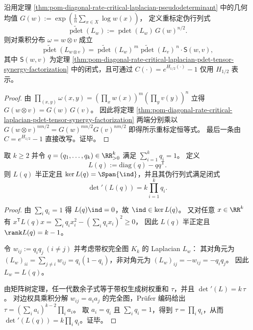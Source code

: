 \begin{corollary}\label{cor:pom-diagonal-rate-critical-laplacian-pdet-tensor-synergy-geometricmean-stripped}
沿用定理 \ref{thm:pom-diagonal-rate-critical-laplacian-pseudodeterminant} 中的几何均值
\(
G(w):=\exp(\frac1n\sum_{x\in X}\log w(x))
\)，
定义重标定伪行列式
\[
\widetilde{\operatorname{pdet}}(L_w):=\operatorname{pdet}(L_w)\,G(w)^{n/2}.
\]
则对乘积分布 \(\omega=w\otimes v\) 成立
\[
\widetilde{\operatorname{pdet}}(L_{w\otimes v})
=\widetilde{\operatorname{pdet}}(L_w)^{\,m}\widetilde{\operatorname{pdet}}(L_v)^{\,n}\cdot \mathsf S(w,v),
\]
其中 \(\mathsf S(w,v)\) 为定理 \ref{thm:pom-diagonal-rate-critical-laplacian-pdet-tensor-synergy-factorization} 中的闭式，且可通过
\(
C(\cdot)=e^{H_{1/2}(\cdot)}-1
\)
仅用 \(H_{1/2}\) 表示。
\end{corollary}
\begin{proof}
由 \(\prod_{(x,y)}\omega(x,y)=(\prod_x w(x))^m(\prod_y v(y))^n\) 立得 \(G(w\otimes v)=G(w)\,G(v)\)。
因此将定理 \ref{thm:pom-diagonal-rate-critical-laplacian-pdet-tensor-synergy-factorization} 两端分别乘以 \(G(w\otimes v)^{nm/2}=G(w)^{mn/2}G(v)^{nm/2}\) 即得所示重标定恒等式。
最后一条由 \(C=e^{H_{1/2}}-1\) 直接改写。证毕。
\end{proof}

\begin{proposition}[概率单纯形的协方差拉普拉斯的伪行列式闭式]\label{prop:covariance-laplacian-pdet-closed-form}
取 \(k\ge 2\) 并令 \(q=(q_1,\dots,q_k)\in\RR_{>0}^k\) 满足 \(\sum_{i=1}^{k}q_i=1\)。
定义
\[
L(q):=\mathrm{diag}(q)-qq^{\mathsf T}.
\]
则 \(L(q)\) 半正定且 \(\ker L(q)=\Span\{\ind\}\)，并且其伪行列式满足闭式
\[
\boxed{\;\det{}'(L(q))=k\prod_{i=1}^{k}q_i.\;}
\]
\end{proposition}
\begin{proof}
由 \(\sum_i q_i=1\) 得 \(L(q)\ind=0\)，故 \(\ind\in\ker L(q)\)。
又对任意 \(x\in\RR^k\) 有
\(
x^{\mathsf T}L(q)x=\sum_i q_i x_i^2-(\sum_i q_i x_i)^2\ge 0
\)，
因此 \(L(q)\) 半正定且 \(\rank L(q)=k-1\)。
\par
令 \(w_{ij}:=q_iq_j\ (i\neq j)\) 并考虑带权完全图 \(K_k\) 的 Laplacian \(L_w\)：
其对角元为 \( (L_w)_{ii}=\sum_{j\neq i}w_{ij}=q_i(1-q_i)\)，非对角元为 \((L_w)_{ij}=-w_{ij}=-q_iq_j\)。
因此 \(L_w=L(q)\)。
\par
由矩阵树定理，任一代数余子式等于带权生成树权重和 \(\tau\)，并且 \(\det{}'(L)=k\,\tau\)。
对边权具乘积分解 \(w_{ij}=a_ia_j\) 的完全图，Prüfer 编码给出
\(
\tau=(\sum_i a_i)^{k-2}\prod_i a_i
\)。
取 \(a_i=q_i\) 且 \(\sum_i q_i=1\)，得到 \(\tau=\prod_i q_i\)，从而 \(\det{}'(L(q))=k\prod_i q_i\)。证毕。
\end{proof}
